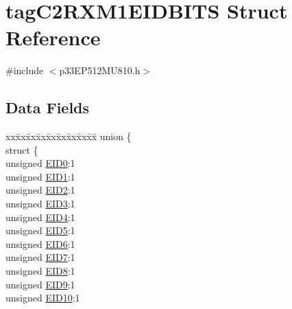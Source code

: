 \hypertarget{structtag_c2_r_x_m1_e_i_d_b_i_t_s}{}\section{tag\+C2\+R\+X\+M1\+E\+I\+D\+B\+I\+TS Struct Reference}
\label{structtag_c2_r_x_m1_e_i_d_b_i_t_s}


{\ttfamily \#include $<$p33\+E\+P512\+M\+U810.\+h$>$}

\subsection*{Data Fields}
\begin{DoxyCompactItemize}
\item 
\begin{tabbing}
xx\=xx\=xx\=xx\=xx\=xx\=xx\=xx\=xx\=\kill
union \{\\
\>struct \{\\
\>\>unsigned \hyperlink{structtag_c2_r_x_m1_e_i_d_b_i_t_s_a9da8b7b30247e4f9cd8cc056549aa9fd}{EID0}:1\\
\>\>unsigned \hyperlink{structtag_c2_r_x_m1_e_i_d_b_i_t_s_afd6c139491d147c1262f3d051c6691e9}{EID1}:1\\
\>\>unsigned \hyperlink{structtag_c2_r_x_m1_e_i_d_b_i_t_s_a36ec62d8d3c5acd5d15e6691dc099a94}{EID2}:1\\
\>\>unsigned \hyperlink{structtag_c2_r_x_m1_e_i_d_b_i_t_s_ab895f7d0ac289a0383b607cbc62eebe2}{EID3}:1\\
\>\>unsigned \hyperlink{structtag_c2_r_x_m1_e_i_d_b_i_t_s_a136d5a709d6618d40acceccb43036656}{EID4}:1\\
\>\>unsigned \hyperlink{structtag_c2_r_x_m1_e_i_d_b_i_t_s_a8dffb2d86a6c184df505ae7c71a58710}{EID5}:1\\
\>\>unsigned \hyperlink{structtag_c2_r_x_m1_e_i_d_b_i_t_s_af8a8574102515d8f1a4b7fd1685d0532}{EID6}:1\\
\>\>unsigned \hyperlink{structtag_c2_r_x_m1_e_i_d_b_i_t_s_a84c3262e67f8d5fd387ac10bde6fa9b1}{EID7}:1\\
\>\>unsigned \hyperlink{structtag_c2_r_x_m1_e_i_d_b_i_t_s_acca25e0b7d86eb499d01f85222baea87}{EID8}:1\\
\>\>unsigned \hyperlink{structtag_c2_r_x_m1_e_i_d_b_i_t_s_ac6748f73d4ada8538b06548be4f396c2}{EID9}:1\\
\>\>unsigned \hyperlink{structtag_c2_r_x_m1_e_i_d_b_i_t_s_a9cea8e77ecbb72bd3b08102412793725}{EID10}:1\\

\end{tabbing}
\end{DoxyCompactItemize}
